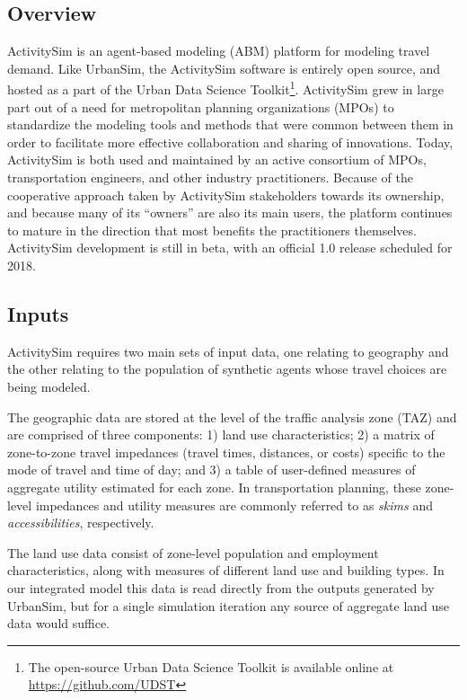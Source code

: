 \subsection{Overview}

ActivitySim is an agent-based modeling (ABM) platform for modeling travel demand. Like UrbanSim, the ActivitySim software is entirely open source, and hosted as a part of the Urban Data Science Toolkit\footnote{The open-source Urban Data Science Toolkit is available online at \url{https://github.com/UDST}}. ActivitySim grew in large part out of a need for metropolitan planning organizations (MPOs) to standardize the modeling tools and methods that were common between them in order to facilitate more effective collaboration and sharing of innovations. Today, ActivitySim is both used and maintained by an active consortium of MPOs, transportation engineers, and other industry practitioners. Because of the cooperative approach taken by ActivitySim stakeholders towards its ownership, and because many of its \enquote{owners} are also its main users, the platform continues to mature in the direction that most benefits the practitioners themselves. ActivitySim development is still in beta, with an official 1.0 release scheduled for 2018.

\subsection{Inputs}

ActivitySim requires two main sets of input data, one relating to geography and the other relating to the population of synthetic agents whose travel choices are being modeled.

The geographic data are stored at the level of the traffic analysis zone (TAZ) and are comprised of three components: 1) land use characteristics; 2) a matrix of zone-to-zone travel impedances (travel times, distances, or costs) specific to the mode of travel and time of day; and 3) a table of user-defined measures of aggregate utility estimated for each zone. In transportation planning, these zone-level impedances and utility measures are commonly referred to as \emph{skims} and \emph{accessibilities}, respectively.

The land use data consist of zone-level population and employment characteristics, along with measures of different land use and building types. In our integrated model this data is read directly from the outputs generated by UrbanSim, but for a single simulation iteration any source of aggregate land use data would suffice.

